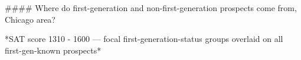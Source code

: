 #### Where do first-generation and non-first-generation prospects come from, Chicago area?

*SAT score 1310 - 1600 — focal first-generation-status groups overlaid on all first-gen-known prospects*
